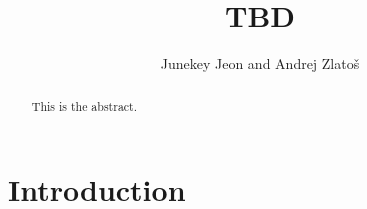 \documentclass[reqno,centertags,12pt]{amsart}
\theoremstyle{definition}
\numberwithin{equation}{section}
\begin{document}
\title[TBD]
{TBD}

\author{Junekey Jeon and Andrej Zlato\v{s}}

\address{\noindent Department of Mathematics \\ University of
California San Diego \\ La Jolla, CA 92093 \newline Email: \tt
zlatos@ucsd.edu,
j6jeon@ucsd.edu}


\begin{abstract}
    This is the abstract.
\end{abstract}

\maketitle


\section{Introduction} \label{S1}
\end{document}
